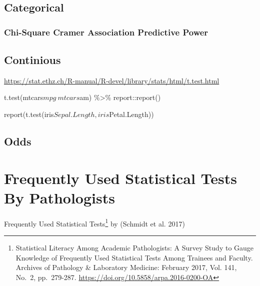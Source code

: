 \documentclass[
]{article}
\begin{document}
\hypertarget{categorical}{%
\subsection{Categorical}\label{categorical}}

\hypertarget{chi-square-cramer-association-predictive-power}{%
\subsubsection{Chi-Square Cramer Association Predictive
Power}\label{chi-square-cramer-association-predictive-power}}

\hypertarget{continious}{%
\subsection{Continious}\label{continious}}

\url{https://stat.ethz.ch/R-manual/R-devel/library/stats/html/t.test.html}

t.test(mtcars\(mpg ~ mtcars\)am) \%\textgreater\% report::report()

report(t.test(iris\(Sepal.Length, iris\)Petal.Length))

\hypertarget{odds}{%
\subsection{Odds}\label{odds}}

\hypertarget{frequently-used-statistical-tests-by-pathologists}{%
\section{Frequently Used Statistical Tests By
Pathologists}\label{frequently-used-statistical-tests-by-pathologists}}

Frequently Used Statistical Tests\footnote{Statistical Literacy Among
  Academic Pathologists: A Survey Study to Gauge Knowledge of Frequently
  Used Statistical Tests Among Trainees and Faculty. Archives of
  Pathology \& Laboratory Medicine: February 2017, Vol. 141, No.~2,
  pp.~279-287. \url{https://doi.org/10.5858/arpa.2016-0200-OA}} by
(Schmidt et al. 2017)
\end{document}
